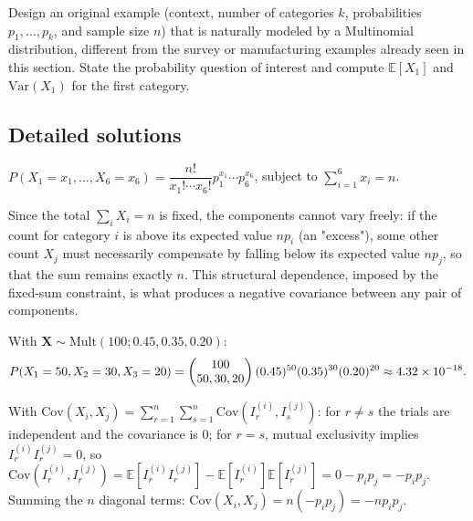 \begin{problema}
	\label{prob:858a3a8}
	Design an original example (context, number of categories $k$, probabilities $p_1,\dots,p_k$, and sample size $n$) that is naturally modeled by a Multinomial distribution, different from the survey or manufacturing examples already seen in this section. State the probability question of interest and compute $\mathbb{E}[X_1]$ and $\text{Var}(X_1)$ for the first category.
\end{problema}

\subsection*{Detailed solutions}

\begin{solproblema}[prob:2499194]
	$P(X_1=x_1,\dots,X_6=x_6) = \dfrac{n!}{x_1!\cdots x_6!}p_1^{x_1}\cdots p_6^{x_6}$, subject to $\sum_{i=1}^6 x_i = n$.
\end{solproblema}

\begin{solproblema}[prob:97df06e]
	Since the total $\sum_i X_i = n$ is fixed, the components cannot vary freely: if the count for category $i$ is above its expected value $np_i$ (an "excess"), some other count $X_j$ must necessarily compensate by falling below its expected value $np_j$, so that the sum remains exactly $n$. This structural dependence, imposed by the fixed-sum constraint, is what produces a negative covariance between any pair of components.
\end{solproblema}

\begin{solproblema}[prob:33bf5d2]
	With $\bm{X}\sim\text{Mult}(100; 0.45,0.35,0.20)$:
	\begin{align*}
		P(X_1=50,X_2=30,X_3=20) = \begin{pmatrix} 100 \\ 50,30,20\end{pmatrix}(0.45)^{50}(0.35)^{30}(0.20)^{20} \approx 4.32\times10^{-18}.
	\end{align*}
\end{solproblema}

\begin{solproblema}[prob:277341a]
	With $\text{Cov}(X_i,X_j) = \sum_{r=1}^n\sum_{s=1}^n \text{Cov}(I_r^{(i)}, I_s^{(j)})$: for $r\neq s$ the trials are independent and the covariance is $0$; for $r=s$, mutual exclusivity implies $I_r^{(i)}I_r^{(j)}=0$, so $\text{Cov}(I_r^{(i)},I_r^{(j)}) = \mathbb{E}[I_r^{(i)}I_r^{(j)}]-\mathbb{E}[I_r^{(i)}]\mathbb{E}[I_r^{(j)}] = 0-p_ip_j = -p_ip_j$. Summing the $n$ diagonal terms: $\text{Cov}(X_i,X_j) = n(-p_ip_j) = -np_ip_j$.
\end{solproblema}

